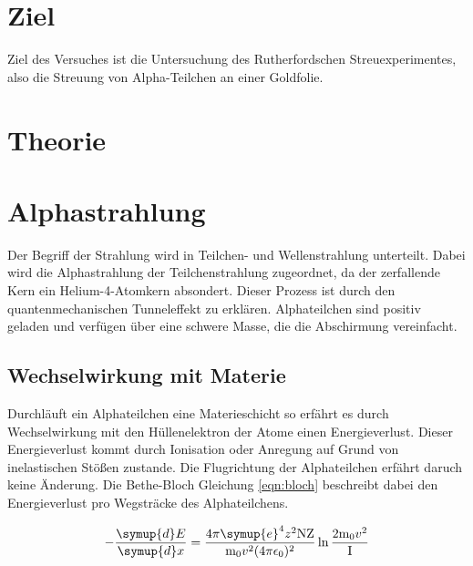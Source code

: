 \section{Ziel}
Ziel des Versuches ist die Untersuchung des Rutherfordschen Streuexperimentes,
also die Streuung von Alpha-Teilchen an einer Goldfolie.

\section{Theorie}
\section{Alphastrahlung}
Der Begriff der Strahlung wird in Teilchen- und Wellenstrahlung unterteilt. Dabei
wird die Alphastrahlung der Teilchenstrahlung zugeordnet, da der zerfallende
Kern ein Helium-4-Atomkern absondert. Dieser Prozess ist durch den quantenmechanischen
Tunneleffekt zu erklären. Alphateilchen sind positiv geladen und verfügen über
eine schwere Masse, die die Abschirmung vereinfacht.

\subsection{Wechselwirkung mit Materie}
Durchläuft ein Alphateilchen eine Materieschicht so erfährt es durch
Wechselwirkung mit den Hüllenelektron der Atome einen Energieverlust. Dieser
Energieverlust kommt durch Ionisation oder Anregung auf Grund von inelastischen
Stößen zustande. Die Flugrichtung der Alphateilchen erfährt daruch keine
Änderung. Die Bethe-Bloch Gleichung \eqref{eqn:bloch} beschreibt dabei den
Energieverlust pro Wegsträcke des Alphateilchens.

\begin{equation}
- \frac{\symup{d} E}{\symup{d} x} = \frac{4 \pi \symup{e}^4 z^2 \text{N} \text{Z}}
{\text{m}_0 v^2 (4 \pi \epsilon_0)^2} \ln\frac{2 \text{m}_0 v^2}{\text{I}}
\end{equation}
